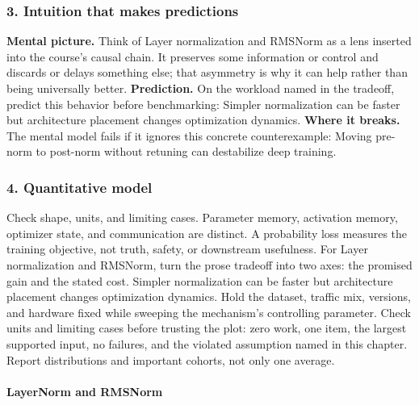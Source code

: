 \subsubsection*{3. Intuition that makes predictions}
\textbf{Mental picture.} Think of Layer normalization and RMSNorm as a lens inserted into the course's causal chain. It preserves some information or control and discards or delays something else; that asymmetry is why it can help rather than being universally better.
\textbf{Prediction.} On the workload named in the tradeoff, predict this behavior before benchmarking: Simpler normalization can be faster but architecture placement changes optimization dynamics.
\textbf{Where it breaks.} The mental model fails if it ignores this concrete counterexample: Moving pre-norm to post-norm without retuning can destabilize deep training.
\subsubsection*{4. Quantitative model}
Check shape, units, and limiting cases. Parameter memory, activation memory, optimizer state, and communication are distinct. A probability loss measures the training objective, not truth, safety, or downstream usefulness.
For Layer normalization and RMSNorm, turn the prose tradeoff into two axes: the promised gain and the stated cost. Simpler normalization can be faster but architecture placement changes optimization dynamics. Hold the dataset, traffic mix, versions, and hardware fixed while sweeping the mechanism's controlling parameter.
Check units and limiting cases before trusting the plot: zero work, one item, the largest supported input, no failures, and the violated assumption named in this chapter. Report distributions and important cohorts, not only one average.
\paragraph{LayerNorm and RMSNorm}
